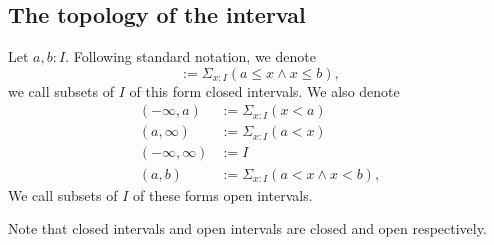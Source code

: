 \subsection{The topology of the interval}


\begin{definition}
  Let $a,b:I$. 
  Following standard notation, we denote
  \begin{equation}
    [a,b]:= \Sigma_{x:I} (a\leq x \wedge x \leq b),
  \end{equation}
  we call subsets of $I$ of this form closed intervals. 
%
  We also denote 
  \begin{align}
    (-\infty,a) &:= \Sigma_{x:I} (x < a)   \\
    (a,\infty) &:= \Sigma_{x:I} (a < x)  \\
    (-\infty,\infty) &:= I  \\
    (a,b) &:= \Sigma_{x:I} (a < x \wedge x < b),
  \end{align}
  We call subsets of $I$ of these forms open intervals. 
\end{definition}
\begin{remark}
  Note that closed intervals and open intervals are closed and open respectively. 
\end{remark}




